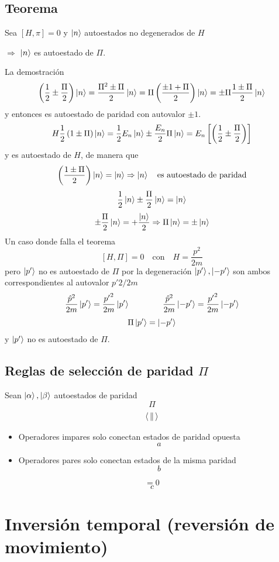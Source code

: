 \documentclass[10pt,oneside]{CBFT_book}
\begin{document}
\subsection{Teorema}

Sea $[H,\pi]=0$ y $\Ket{n}$ autoestados no degenerados de $H$ 

	$\Rightarrow$ $\Ket{n}$ es autoestado de $\Pi$.

La demostración 
\[
	\left(\frac{1}{2}\pm \frac{\Pi}{2}\right)\Ket{n} = \frac{\Pi^2\pm\Pi}{2}\Ket{n} = 
	\Pi \left( \frac{\pm 1+\Pi}{2}\right)\Ket{n} = \pm\Pi \frac{1\pm\Pi}{2}\Ket{n}
\]
y entonces es autoestado de paridad con autovalor $\pm 1$. 
\[
	H\frac{1}{2}\left(1\pm\Pi\right)\Ket{n} = \frac{1}{2}E_n\Ket{n} \pm \frac{E_n}{2}\Pi\Ket{n} =
	E_n\left[ \left( \frac{1}{2} \pm \frac{\Pi}{2}\right) \right]
\]
y es autoestado de $H$, de manera que 
\[
	\left( \frac{1\pm\Pi}{2}\right)\Ket{n} = \Ket{n} \Rightarrow \Ket{n} \quad \text{es autoestado de 
paridad}
\]
\[
	\frac{1}{2}\Ket{n} \pm \frac{\Pi}{2}\Ket{n} = \Ket{n}
\]
\[
	\pm \frac{\Pi}{2}\Ket{n} = +\frac{\Ket{n}}{2} \Rightarrow \Pi\Ket{n} = \pm\Ket{n}
\]
Un caso donde falla el teorema 
\[
	[H,\Pi]=0 \quad \text{con} \quad H=\frac{p^2}{2m} 
\]
pero $\Ket{p'}$ no es autoestado de $\Pi$ por la degeneración $\Ket{p'},\Ket{-p'}$ son ambos correspondientes 
al autovalor $p'2/2m$
\[
	\frac{\hat{p}^2}{2m}\Ket{p'} = \frac{{p'}^2}{2m}\Ket{p'} \qquad  \qquad 
	\frac{\hat{p}^2}{2m}\Ket{-p'} = \frac{{p'}^2}{2m}\Ket{-p'}
\]
\[
	\Pi\Ket{p'}= \Ket{-p'}
\]
y $\Ket{p'}$ no es autoestado de $\Pi$.

\subsection{Reglas de selección de paridad $\Pi$}

Sean $\Ket{\alpha}, \Ket{\beta}$ autoestados de paridad 
\[
	\Pi
\]
\[
	\Braket{||}
\]

\begin{itemize}
 \item Operadores impares solo conectan estados de paridad opuesta
 \[
	a
 \]
 \item Operadores pares solo conectan estados de la misma paridad 
 \[
	b
 \]
\end{itemize}

\[
	= 0
\]
\[
	c
\]

\section{Inversión temporal (reversión de movimiento)}
\end{document}
